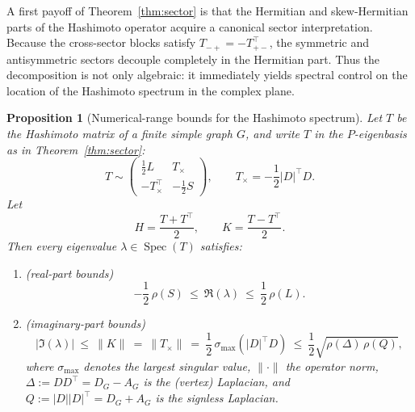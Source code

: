 \documentclass[11pt]{article}
\newtheorem{proposition}{Proposition}
\begin{document}
A first payoff of Theorem~\ref{thm:sector} is that the Hermitian and skew-Hermitian parts of the Hashimoto operator acquire a canonical sector interpretation. Because the cross-sector blocks satisfy
$T_{-+}=-T_{+-}^\top$, the symmetric and antisymmetric sectors decouple completely in the Hermitian part. Thus the decomposition is not only algebraic: it immediately yields spectral control on the location of the Hashimoto spectrum in the complex plane.


\begin{proposition}[Numerical-range bounds for the Hashimoto spectrum]\label{prop:numerical-range}
Let $T$ be the Hashimoto matrix of a finite simple graph $G$, and write $T$ in the
$P$-eigenbasis as in Theorem~\ref{thm:sector}:
\[
T \sim
\begin{pmatrix}
\frac12 L & T_\times\\[2pt]
- T_\times^\top & -\frac12 S
\end{pmatrix},
\qquad
T_\times=-\frac12|D|^\top D.
\]
Let
\[
H=\frac{T+T^\top}{2},\qquad K=\frac{T-T^\top}{2}.
\]
Then every eigenvalue $\lambda\in\operatorname{Spec}(T)$ satisfies:
\begin{enumerate}
\item[(i)] \emph{(real-part bounds)}
\[
-\frac12\,\rho(S)\ \le\ \Re(\lambda)\ \le\ \frac12\,\rho(L).
\]
\item[(ii)] \emph{(imaginary-part bounds)}
\[
|\Im(\lambda)|\ \le\ \|K\|\ =\ \|T_\times\|\ =\ \frac12\,\sigma_{\max}(|D|^\top D)
\ \le\ \frac12\sqrt{\rho(\Delta)\,\rho(Q)},
\]
where $\sigma_{\max}$ denotes the largest singular value, $\|\cdot\|$ the operator norm,
$\Delta:=DD^\top=D_G-A_G$ is the (vertex) Laplacian, and $Q:=|D||D|^\top=D_G+A_G$ is the signless Laplacian.
\end{enumerate}
\end{proposition}
\end{document}
